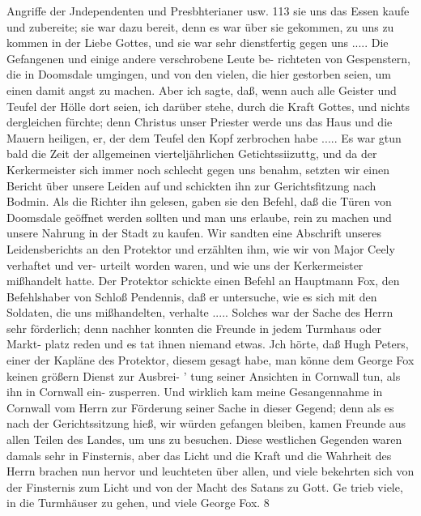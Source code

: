 Angriffe der Jndependenten und Presbhterianer usw. 113
sie uns das Essen kaufe und zubereite; sie war dazu bereit, denn
es war über sie gekommen, zu uns zu kommen in der Liebe
Gottes, und sie war sehr dienstfertig gegen uns .....
Die Gefangenen und einige andere verschrobene Leute be-
richteten von Gespenstern, die in Doomsdale umgingen, und von
den vielen, die hier gestorben seien, um einen damit angst zu
machen. Aber ich sagte, daß, wenn auch alle Geister und Teufel
der Hölle dort seien, ich darüber stehe, durch die Kraft Gottes,
und nichts dergleichen fürchte; denn Christus unser Priester werde
uns das Haus und die Mauern heiligen, er, der dem Teufel den
Kopf zerbrochen habe .....
Es war gtun bald die Zeit der allgemeinen vierteljährlichen
Getichtssiizuttg, und da der Kerkermeister sich immer noch schlecht
gegen uns benahm, setzten wir einen Bericht über unsere Leiden
auf und schickten ihn zur Gerichtsfitzung nach Bodmin. Als die
Richter ihn gelesen, gaben sie den Befehl, daß die Türen von
Doomsdale geöffnet werden sollten und man uns erlaube, rein
zu machen und unsere Nahrung in der Stadt zu kaufen. Wir
sandten eine Abschrift unseres Leidensberichts an den Protektor
und erzählten ihm, wie wir von Major Ceely verhaftet und ver-
urteilt worden waren, und wie uns der Kerkermeister mißhandelt
hatte. Der Protektor schickte einen Befehl an Hauptmann Fox,
den Befehlshaber von Schloß Pendennis, daß er untersuche, wie
es sich mit den Soldaten, die uns mißhandelten, verhalte .....
Solches war der Sache des Herrn sehr förderlich; denn
nachher konnten die Freunde in jedem Turmhaus oder Markt-
platz reden und es tat ihnen niemand etwas. Jch hörte, daß
Hugh Peters, einer der Kapläne des Protektor, diesem gesagt habe,
man könne dem George Fox keinen größern Dienst zur Ausbrei-
’ tung seiner Ansichten in Cornwall tun, als ihn in Cornwall ein-
zusperren. Und wirklich kam meine Gesangennahme in Cornwall
vom Herrn zur Förderung seiner Sache in dieser Gegend; denn
als es nach der Gerichtssitzung hieß, wir würden gefangen bleiben,
kamen Freunde aus allen Teilen des Landes, um uns zu besuchen.
Diese westlichen Gegenden waren damals sehr in Finsternis, aber
das Licht und die Kraft und die Wahrheit des Herrn brachen
nun hervor und leuchteten über allen, und viele bekehrten sich
von der Finsternis zum Licht und von der Macht des Satans
zu Gott. Ge trieb viele, in die Turmhäuser zu gehen, und viele
George Fox. 8


